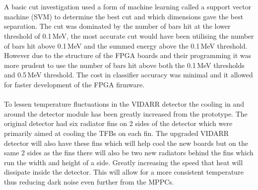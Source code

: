 \\\\A basic cut investigation used a form of machine learning called a support vector machine (SVM) to determine the best cut and which dimensions gave the best separation. The cut was dominated by the number of bars hit at the lower threshold of 0.1\,MeV, the most accurate cut would have been utilising the number of bars hit above 0.1\,MeV and the summed energy above the 0.1\,MeV threshold. However due to the structure of the FPGA boards and their programming it was more prudent to use the number of bars hit above both the 0.1\,MeV thresholds and 0.5\,MeV threshold. The cost in classifier accuracy was minimal and it allowed for faster development of the FPGA firmware. 
\\\\To lessen temperature fluctuations in the VIDARR detector the cooling in and around the detector module has been greatly increased from the prototype. The original detector had six radiator fins on 2 sides of the detector which were primarily aimed at cooling the TFBs on each fin. The upgraded VIDARR detector will also have these fins which will help cool the new boards but on the same 2 sides as the fins there will also be two new radiators behind the fins which run the width and height of a side. Greatly increasing the speed that heat will dissipate inside the detector. This will allow for a more consistent temperature  thus reducing dark noise even further from the MPPCs. 





